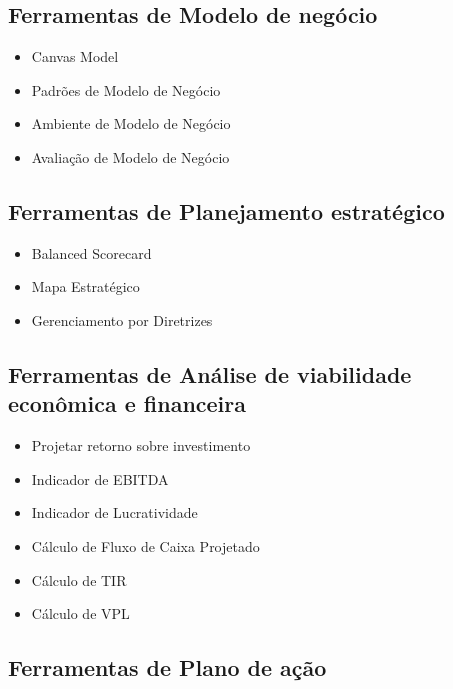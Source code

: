 \documentclass{abnt}
\begin{document}
\subsection{Ferramentas de Modelo de negócio}

\begin{itemize}
	\item Canvas Model \cite{Canvas}
	\item Padrões de Modelo de Negócio \cite{ModeloNegocio}
	\item Ambiente de Modelo de Negócio \cite{AmbienteNegocio}
	\item Avaliação de Modelo de Negócio \cite{Canvas}
\end{itemize}


\subsection{Ferramentas de Planejamento estratégico}

\begin{itemize}
	\item Balanced Scorecard \cite{BSC}
	\item Mapa Estratégico \cite{MapaEstrategico}
	\item Gerenciamento por Diretrizes \cite{GerDiret}
\end{itemize}

\subsection{Ferramentas de Análise de viabilidade econômica e financeira}

\begin{itemize}
	\item Projetar retorno sobre investimento \cite{RetInvest}
	\item Indicador de EBITDA \cite{Ebitda}
	\item Indicador de Lucratividade \cite{Lucratividade}
	\item Cálculo de Fluxo de Caixa Projetado \cite{FluxoCaixa}
	\item Cálculo de TIR \cite{TIR}
	\item Cálculo de VPL \cite{VPL}
\end{itemize}

\subsection{Ferramentas de Plano de ação}
\end{document}
